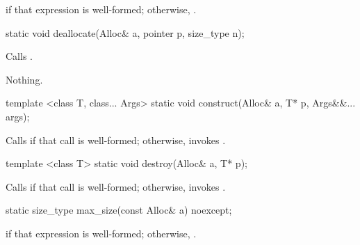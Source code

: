 \begin{itemdescr}
\pnum
\returns {} if that expression is well-formed; otherwise, .
\end{itemdescr}

%
%
\begin{itemdecl}
static void deallocate(Alloc& a, pointer p, size_type n);
\end{itemdecl}

\begin{itemdescr}
\pnum
\effects Calls .

\pnum
\throws Nothing.
\end{itemdescr}

%
\begin{itemdecl}
template <class T, class... Args>
  static void construct(Alloc& a, T* p, Args&&... args);
\end{itemdecl}

\begin{itemdescr}
\pnum
\effects Calls 
if that call is well-formed;
otherwise, invokes .
\end{itemdescr}

%
\begin{itemdecl}
template <class T>
  static void destroy(Alloc& a, T* p);
\end{itemdecl}

\begin{itemdescr}
\pnum
\effects Calls  if that call is well-formed; otherwise, invokes
.
\end{itemdescr}

%
%
\begin{itemdecl}
static size_type max_size(const Alloc& a) noexcept;
\end{itemdecl}

\begin{itemdescr}
\pnum
\returns {} if that expression is well-formed; otherwise,
.
\end{itemdescr}

